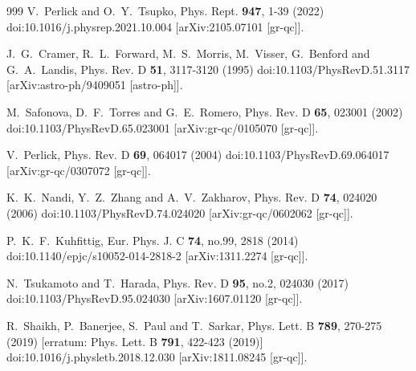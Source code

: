 \documentclass[aps,preprint,groupedaddress,nofootinbib,superscriptaddress,showkeys,showpacs,eqsecnum,amsmath,amssymb]{revtex4-1}
\begin{document}
\begin{thebibliography}{999}
V.~Perlick and O.~Y.~Tsupko,
Phys. Rept. \textbf{947}, 1-39 (2022)
doi:10.1016/j.physrep.2021.10.004
[arXiv:2105.07101 [gr-qc]].






J.~G.~Cramer, R.~L.~Forward, M.~S.~Morris, M.~Visser, G.~Benford and G.~A.~Landis,
Phys. Rev. D \textbf{51}, 3117-3120 (1995)
doi:10.1103/PhysRevD.51.3117
[arXiv:astro-ph/9409051 [astro-ph]].

M.~Safonova, D.~F.~Torres and G.~E.~Romero,
Phys. Rev. D \textbf{65}, 023001 (2002)
doi:10.1103/PhysRevD.65.023001
[arXiv:gr-qc/0105070 [gr-qc]].

V.~Perlick,
Phys. Rev. D \textbf{69}, 064017 (2004)
doi:10.1103/PhysRevD.69.064017
[arXiv:gr-qc/0307072 [gr-qc]].

K.~K.~Nandi, Y.~Z.~Zhang and A.~V.~Zakharov,
Phys. Rev. D \textbf{74}, 024020 (2006)
doi:10.1103/PhysRevD.74.024020
[arXiv:gr-qc/0602062 [gr-qc]].

P.~K.~F.~Kuhfittig,
Eur. Phys. J. C \textbf{74}, no.99, 2818 (2014)
doi:10.1140/epjc/s10052-014-2818-2
[arXiv:1311.2274 [gr-qc]].

N.~Tsukamoto and T.~Harada,
Phys. Rev. D \textbf{95}, no.2, 024030 (2017)
doi:10.1103/PhysRevD.95.024030
[arXiv:1607.01120 [gr-qc]].

R.~Shaikh, P.~Banerjee, S.~Paul and T.~Sarkar,
Phys. Lett. B \textbf{789}, 270-275 (2019)
[erratum: Phys. Lett. B \textbf{791}, 422-423 (2019)]
doi:10.1016/j.physletb.2018.12.030
[arXiv:1811.08245 [gr-qc]].


\end{thebibliography}
\end{document}
